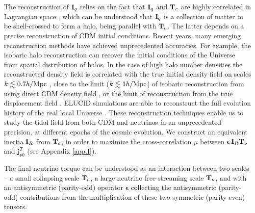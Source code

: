 \documentclass[aps,prd,twocolumn,amsmath,amssymb,amsfont,superscriptaddress,nofootinbib]{revtex4-1}
\newcommand{\bs}{\boldsymbol}
\newcommand{\T}{\bold{T}}
\newcommand{\I}{\bold{I}}
\newcommand{\spin}{\bs{j}}
\begin{document}
The reconstruction of $\I_q$ relies on the fact that $\I_q$ and $\T_c$ are highly correlated in Lagrangian space \citep{2000ApJ...532L...5L,2001ApJ...555..106L},
which can be understood that $\I_q$ is a collection of matter to be shell-crossed to form a halo, being parallel with $\T_c$.
The latter depends on a precise reconstruction of CDM initial conditions. 
Recent years, many emerging reconstruction methods have achieved unprecedented accuracies.
For example, the isobaric halo reconstruction \citep{2017PhRvD..96l3502Z} can recover the initial conditions of the Universe from spatial distribution of halos.
In the case of high halo number densities the reconstructed density field is correlated with the true initial density field on scales $k\lesssim 0.7 h/{\rm Mpc}$ \citep{2017ApJ...847..110Y}, 
close to the limit ($k\lesssim 1 h/{\rm Mpc}$) of isobaric reconstruction from using direct CDM density field \citep{2017MNRAS.469.1968P}, 
or the limit of reconstruction from the true displacement field \citep{2017PhRvD..95d3501Y}. 
ELUCID simulations are able to reconstruct the full evolution history of the real local Universe \citep{2014ApJ...794...94W}. These reconstruction techniques enable us to study the tidal field from both CDM and neutrinos in an unprecedented precision, at different epochs of the cosmic evolution. We construct an equivalent inertia $\I_R$ from $\T_c$, in order to maximize the cross-correlation $\mu$ between $\bs{\epsilon}\,\I_R\T_\nu$ and $\spin^T_{\nu 0}$ (see Appendix \ref{app.I}).

The final neutrino torque can be understood as an interaction between two scales -- a small collapsing scale $\T_c$,
a large neutrino free-streaming scale $\T_\nu$,
and with an antisymmetric (parity-odd) operator $\bs{\epsilon}$ collecting the antisymmetric (parity-odd) contributions from the multiplication of these two symmetric (parity-even) tensors.

 
\end{document}
